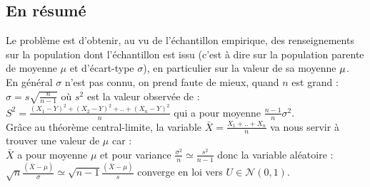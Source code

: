 \documentclass[a4paper,11pt]{book}
\begin{document}
\subsection{En r\'esum\'e}
Le probl\`eme est d'obtenir, au vu de l'\'echantillon empirique, des 
renseignements sur la population dont l'\'echantillon  est issu (c'est \`a dire
sur la population parente de moyenne $\mu$ et d'\'ecart-type $\sigma$), en 
particulier sur la valeur de sa moyenne ${\tt \mu}$.\\
En g\'en\'eral $\sigma$ n'est pas connu, on prend faute de mieux, quand $n$ est
grand :\\ 
$\sigma=s \sqrt {\frac{n}{n-1}}$ o\`u $ s^2$ est la valeur 
observ\'ee de :\\
$\displaystyle S^2=\frac{(X_1-Y)^2+(X_2-Y)^2+..+(X_n-Y)^2}{n}$ qui a pour  
moyenne  $\displaystyle \frac{n-1}{n}\sigma^2$.\\
Gr\^ace au th\'eor\`eme central-limite, la variable $\displaystyle \bar X=\frac{X_1+..+X_n}{n}$  va nous servir \`a trouver une valeur de $\mu$ car :\\
$\bar X$ a pour  moyenne $\mu$ et  pour variance 
$\displaystyle \frac{\sigma^2}{n} \simeq \frac{s^2}{n-1}$ donc la 
variable al\'eatoire :\\  
$\displaystyle \sqrt n \frac{(\bar X-\mu)}{\sigma}\simeq \sqrt {n-1} \frac{(\bar X-\mu)}{s}$ converge en 
loi vers $ U \in \mathcal N(0,1)$.\\
\end{document}
